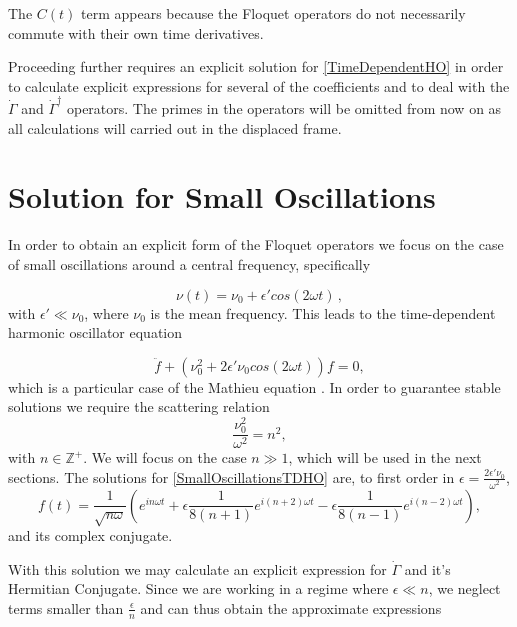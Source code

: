 \documentclass[reprint, amsmath,amssymb, aps,pra]{revtex4-1}
\begin{document}
The $C(t)$ term appears because the Floquet operators do not necessarily commute with
their own time derivatives.

Proceeding further requires an explicit solution for
\eqref{TimeDependentHO} in order to calculate explicit expressions for several of the coefficients and to deal with the $\dot{\Gamma}$ and $\dot{\Gamma}^\dagger$ operators. The primes in the operators will be omitted
from now on as all calculations will carried out in the displaced frame.


\section{Solution for Small Oscillations}\label{SolSmallOsc}
 
In order to obtain an explicit form of the Floquet operators we focus
on the case of small oscillations around a central frequency,
specifically

\begin{equation}
\nu(t) = \nu_0 + \epsilon' cos(2\omega t)\, ,
\end{equation}
with $\epsilon' \ll \nu_0$, where $\nu_0$ is the mean frequency. This
leads to the time-dependent harmonic oscillator equation

\begin{equation}\label{SmallOscillationsTDHO}
\ddot{f} + (\nu_0^2 + 2\epsilon' \nu_0 cos(2\omega t))f = 0,
\end{equation}
which is a particular case of the Mathieu equation \cite{PiatekME}.
In order to guarantee stable solutions we require the scattering
relation
\begin{equation}
\frac{\nu_0^2}{\omega^2} = n^2,\label{scattering}
\end{equation}
with $n \in \mathbb{Z}^+$\cite{WardFT}. We will focus on the case
$n\gg 1$, which will be used in the next sections. The solutions for
\eqref{SmallOscillationsTDHO} are, to first order in
$\epsilon= \frac{2\epsilon' \nu_0}{\omega^2}$,
\begin{equation}\label{SmallOscillationsSolution}
f(t)=  \frac{1}{\sqrt{n\omega}}(e^{in\omega t}  + \epsilon \frac{1}{8(n+1)} e^{i(n+2) \omega t} - \epsilon \frac{1}{8(n-1)} e^{i(n-2) \omega t}),
\end{equation} and its complex conjugate.

With this solution we may calculate an explicit expression for
$\dot{\Gamma}$ and it's Hermitian Conjugate. Since we are working in a
regime where $\epsilon \ll n$, we neglect terms smaller than
$\frac{\epsilon}{n}$ and can thus obtain the approximate expressions
\end{document}
